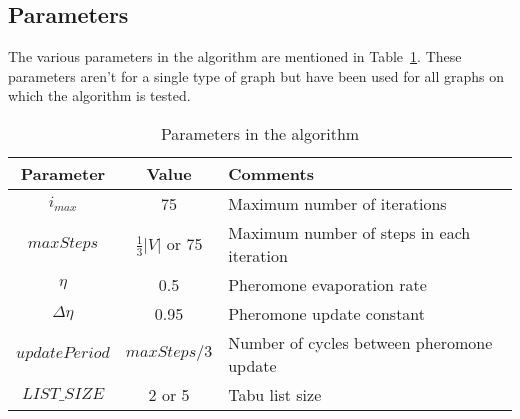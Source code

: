 \begin{spacing}{1.5}
\section{Parameters}

The various parameters in the algorithm are mentioned in Table~\ref{tab1}. These parameters aren't for a single type of graph but have been used for all graphs on which the algorithm is tested.

\begin{table}
\caption{Parameters in the algorithm}
\label{tab1}
\BlankLine
\begin{tabular}{ | c | c | l | }
	\hline
	\textbf{Parameter} & \textbf{Value} & \textbf{Comments} \\
	\hline
	$i_{max}$ & 75 & Maximum number of iterations \\
	\hline
	$maxSteps$ & $\frac{1}{3} |V|$ or 75 & Maximum number of steps in each iteration \\
	\hline
	$\eta$ & 0.5 & Pheromone evaporation rate \\
	\hline
	$\Delta \eta$ & 0.95 & Pheromone update constant \\
	\hline
	$updatePeriod$ & $maxSteps / 3$ & Number of cycles between pheromone update \\
	\hline
	$LIST\_SIZE$ & 2 or 5 & Tabu list size\\
	\hline
\end{tabular}
\end{table}
\end{spacing}